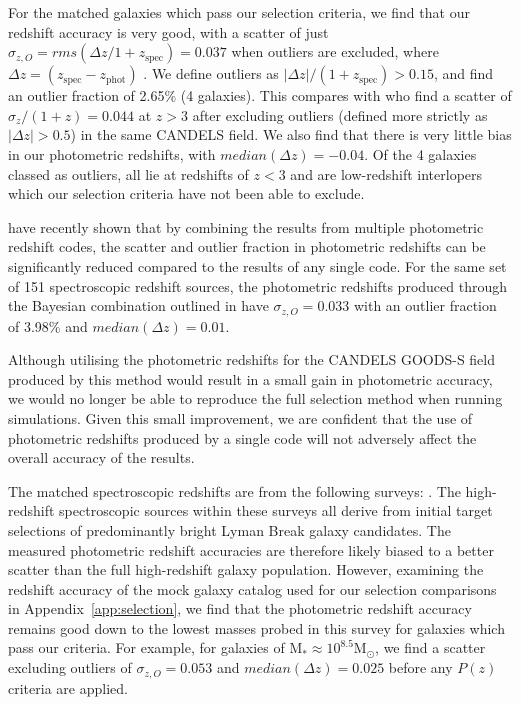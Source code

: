 For the matched galaxies which pass our selection criteria, we find that our redshift accuracy is very good, with a scatter of just $\sigma_{z,O} = rms(\Delta z /1+z_{\text{spec}}) = 0.037$ when outliers are excluded, where $\Delta z =  (z_{\text{spec}}-z_{\text{phot}})$ \citep{Dahlen:2013eu}. We define outliers as $\left | \Delta z \right |/(1+z_{\text{spec}}) > 0.15$, and find an outlier fraction of 2.65\% (4 galaxies). This compares with \citet{2012ApJ...756..164F} who find a scatter of $\sigma_{z}/(1+z) = 0.044$  at $z > 3$ after excluding outliers (defined more strictly as $\left | \Delta z \right | > 0.5$) in the same CANDELS field. We also find that there is very little bias in our photometric redshifts, with $median(\Delta z) = -0.04$. Of the 4 galaxies classed as outliers, all lie at redshifts of $z < 3$ and are low-redshift interlopers which our selection criteria have not been able to exclude.

\citet{Dahlen:2013eu} have recently shown that by combining the results from multiple photometric redshift codes, the scatter and outlier fraction in photometric redshifts can be significantly reduced compared to the results of any single code. For the same set of 151 spectroscopic redshift sources, the photometric redshifts produced through the Bayesian combination outlined in \citet{Dahlen:2013eu} have $\sigma_{z,O} = 0.033$ with an outlier fraction of 3.98\% and $median(\Delta z) = 0.01$. 

Although utilising the photometric redshifts for the CANDELS GOODS-S field produced by this method would result in a small gain in photometric accuracy, we would no longer be able to reproduce the full selection method when running simulations. Given this small improvement, we are confident that the use of photometric redshifts produced by a single code will not adversely affect the overall accuracy of the results.

The matched spectroscopic redshifts are from the following surveys: \citet{LeFvre:2004ge,Stanway:2004gu,Vanzella:2008hp,Hathi:2008ca,Popesso:2009ht,Wuyts:2009gv,Rhoads:2009eb,Vanzella:2009ez,Balestra:2010bt,Kurk:2012ej}. The high-redshift spectroscopic sources within these surveys all derive from initial target selections of predominantly bright Lyman Break galaxy candidates. The measured photometric redshift accuracies are therefore likely biased to a better scatter than the full high-redshift galaxy population. However, examining the redshift accuracy of the mock galaxy catalog used for our selection comparisons in Appendix~\ref{app:selection}, we find that the photometric redshift accuracy remains good down to the lowest masses probed in this survey for galaxies which pass our criteria. For example, for galaxies of $\text{M}_{*} \approx 10^{8.5} \text{M}_{\odot}$, we find a scatter excluding outliers of $\sigma_{z,O} = 0.053$ and $median(\Delta z) = 0.025$ before any $P(z)$ criteria are applied.

